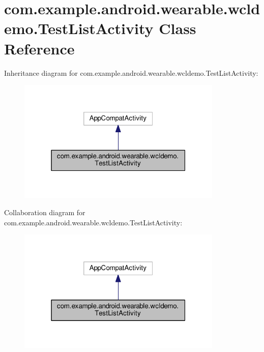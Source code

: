 \hypertarget{classcom_1_1example_1_1android_1_1wearable_1_1wcldemo_1_1TestListActivity}{}\section{com.\+example.\+android.\+wearable.\+wcldemo.\+Test\+List\+Activity Class Reference}
\label{classcom_1_1example_1_1android_1_1wearable_1_1wcldemo_1_1TestListActivity}


Inheritance diagram for com.\+example.\+android.\+wearable.\+wcldemo.\+Test\+List\+Activity\+:\nopagebreak
\begin{figure}[H]
\begin{center}
\leavevmode
\includegraphics[width=277pt]{da/d80/classcom_1_1example_1_1android_1_1wearable_1_1wcldemo_1_1TestListActivity__inherit__graph}
\end{center}
\end{figure}


Collaboration diagram for com.\+example.\+android.\+wearable.\+wcldemo.\+Test\+List\+Activity\+:\nopagebreak
\begin{figure}[H]
\begin{center}
\leavevmode
\includegraphics[width=277pt]{d9/d98/classcom_1_1example_1_1android_1_1wearable_1_1wcldemo_1_1TestListActivity__coll__graph}
\end{center}
\end{figure}
